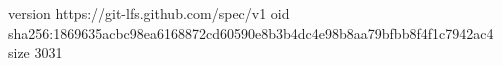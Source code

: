 version https://git-lfs.github.com/spec/v1
oid sha256:1869635acbc98ea6168872cd60590e8b3b4dc4e98b8aa79bfbb8f4f1c7942ac4
size 3031
